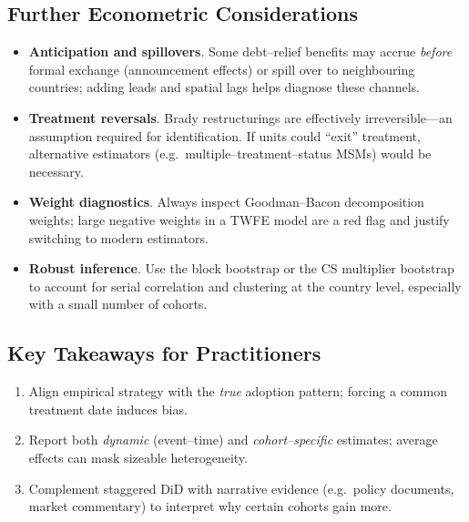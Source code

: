 \subsection{Further Econometric Considerations}

\begin{itemize}
  \item \textbf{Anticipation and spillovers}.  
  Some debt--relief benefits may accrue \emph{before} formal exchange (announcement effects) or spill over to neighbouring countries; adding leads and spatial lags helps diagnose these channels.
  \item \textbf{Treatment reversals}.  
  Brady restructurings are effectively irreversible---an assumption required for identification.  
  If units could ``exit'' treatment, alternative estimators (e.g.\ multiple--treatment--status MSMs) would be necessary.
  \item \textbf{Weight diagnostics}.  
  Always inspect Goodman--Bacon decomposition weights; large negative weights in a TWFE model are a red flag and justify switching to modern estimators.
  \item \textbf{Robust inference}.  
  Use the block bootstrap or the CS multiplier bootstrap to account for serial correlation and clustering at the country level, especially with a small number of cohorts.
\end{itemize}

\subsection{Key Takeaways for Practitioners}
\begin{enumerate}[leftmargin=1.25cm,label=(\alph*)]
  \item Align empirical strategy with the \emph{true} adoption pattern; forcing a common treatment date induces bias.
  \item Report both \emph{dynamic} (event--time) and \emph{cohort--specific} estimates; average effects can mask sizeable heterogeneity.
  \item Complement staggered DiD with narrative evidence (e.g.\ policy documents, market commentary) to interpret why certain cohorts gain more.
\end{enumerate}



